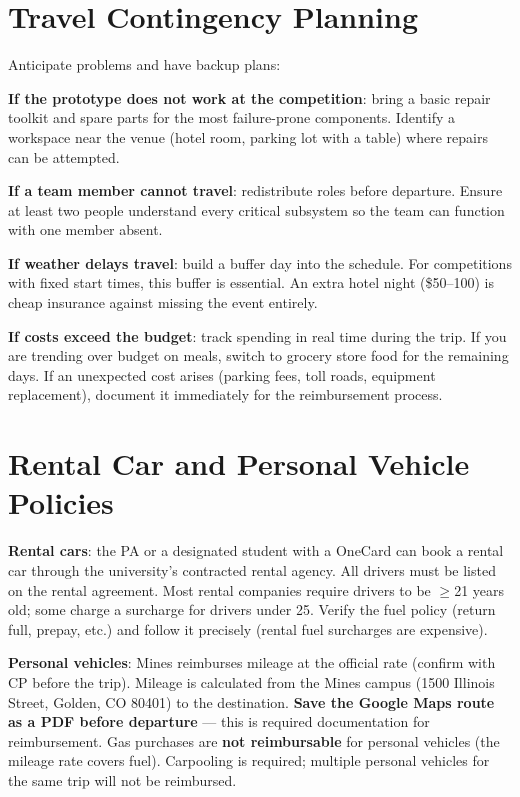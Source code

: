 \section{Travel Contingency Planning}
Anticipate problems and have backup plans:

\textbf{If the prototype does not work at the competition}: bring a basic repair toolkit and spare parts for the most failure-prone components. Identify a workspace near the venue (hotel room, parking lot with a table) where repairs can be attempted.

\textbf{If a team member cannot travel}: redistribute roles before departure. Ensure at least two people understand every critical subsystem so the team can function with one member absent.

\textbf{If weather delays travel}: build a buffer day into the schedule. For competitions with fixed start times, this buffer is essential. An extra hotel night (\$50--100) is cheap insurance against missing the event entirely.

\textbf{If costs exceed the budget}: track spending in real time during the trip. If you are trending over budget on meals, switch to grocery store food for the remaining days. If an unexpected cost arises (parking fees, toll roads, equipment replacement), document it immediately for the reimbursement process.



\section{Rental Car and Personal Vehicle Policies}
\textbf{Rental cars}: the PA or a designated student with a OneCard can book a rental car through the university's contracted rental agency. All drivers must be listed on the rental agreement. Most rental companies require drivers to be $\geq$21 years old; some charge a surcharge for drivers under 25. Verify the fuel policy (return full, prepay, etc.) and follow it precisely (rental fuel surcharges are expensive).

\textbf{Personal vehicles}: Mines reimburses mileage at the official rate (confirm with CP before the trip). Mileage is calculated from the Mines campus (1500 Illinois Street, Golden, CO 80401) to the destination. \textbf{Save the Google Maps route as a PDF before departure} --- this is required documentation for reimbursement. Gas purchases are \textbf{not reimbursable} for personal vehicles (the mileage rate covers fuel). Carpooling is required; multiple personal vehicles for the same trip will not be reimbursed.

